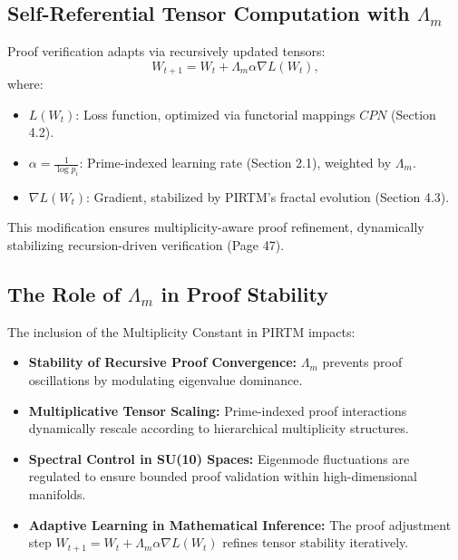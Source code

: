 \documentclass{article}
\theoremstyle{plain}
\begin{document}
\subsection{Self-Referential Tensor Computation with \( \Lambda_m \)}
Proof verification adapts via recursively updated tensors:
\begin{equation}
W_{t+1} = W_t + \Lambda_m \alpha \nabla L(W_t),
\end{equation}
where:
\begin{itemize}
    \item \( L(W_t) \): Loss function, optimized via functorial mappings \( CPN \) (Section 4.2).
    \item \( \alpha = \frac{1}{\log p_i} \): Prime-indexed learning rate (Section 2.1), weighted by \( \Lambda_m \).
    \item \( \nabla L(W_t) \): Gradient, stabilized by PIRTM’s fractal evolution (Section 4.3).
\end{itemize}
This modification ensures multiplicity-aware proof refinement, dynamically stabilizing recursion-driven verification (Page 47).

\subsection{The Role of \( \Lambda_m \) in Proof Stability}
The inclusion of the Multiplicity Constant in PIRTM impacts:
\begin{itemize}
    \item \textbf{Stability of Recursive Proof Convergence:} \(\Lambda_m\) prevents proof oscillations by modulating eigenvalue dominance.
    \item \textbf{Multiplicative Tensor Scaling:} Prime-indexed proof interactions dynamically rescale according to hierarchical multiplicity structures.
    \item \textbf{Spectral Control in SU(10) Spaces:} Eigenmode fluctuations are regulated to ensure bounded proof validation within high-dimensional manifolds.
    \item \textbf{Adaptive Learning in Mathematical Inference:} The proof adjustment step \( W_{t+1} = W_t + \Lambda_m \alpha \nabla L(W_t) \) refines tensor stability iteratively.
\end{itemize}
\end{document}
